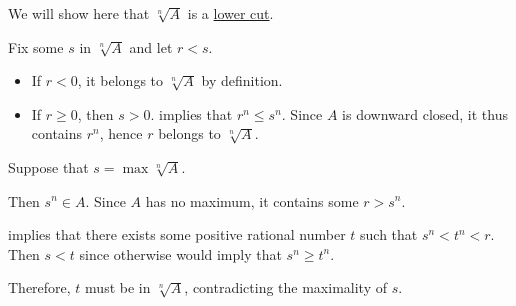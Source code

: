 \begin{defproof}
  We will show here that \( \sqrt[n]{ A } \) is a \hyperref[def:lower_cut]{lower cut}.

   Fix some \( s \) in \( \sqrt[n]{ A } \) and let \( r < s \).

  \begin{itemize}
    \item If \( r < 0 \), it belongs to \( \sqrt[n]{ A } \) by definition.

    \item If \( r \geq 0 \), then \( s > 0 \).  implies that \( r^n \leq s^n \). Since \( A \) is downward closed, it thus contains \( r^n \), hence \( r \) belongs to \( \sqrt[n]{ A } \).
  \end{itemize}

   Suppose that \( s = \max \sqrt[n]{ A } \).

  Then \( s^n \in A \). Since \( A \) has no maximum, it contains some \( r > s^n \).

   implies that there exists some positive rational number \( t \) such that \( s^n < t^n < r \). Then \( s < t \) since otherwise  would imply that \( s^n \geq t^n \).

  Therefore, \( t \) must be in \( \sqrt[n]{ A } \), contradicting the maximality of \( s \).
\end{defproof}

